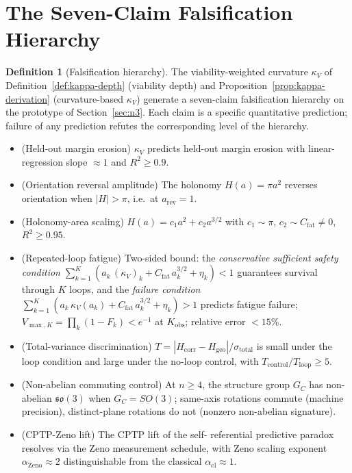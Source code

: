 \documentclass[11pt,a4paper]{article}
\theoremstyle{plain}
\theoremstyle{definition}
\newtheorem{definition}[theorem]{Definition}
\theoremstyle{remark}
\newcommand{\kk}{\kappa_{\!V}}
\newcommand{\so}{\mathfrak{so}}
\begin{document}
\section{The Seven-Claim Falsification Hierarchy}\label{sec:hierarchy}

\begin{definition}[Falsification hierarchy]
\label{def:hierarchy}
The viability-weighted curvature $\kk$ of
Definition~\ref{def:kappa-depth} (viability depth) and
Proposition~\ref{prop:kappa-derivation} (curvature-based $\kk$) generate
a seven-claim falsification
hierarchy on the prototype of Section~\ref{sec:n3}. Each claim is a
specific quantitative prediction; failure of any prediction refutes
the corresponding level of the hierarchy.
\begin{itemize}[leftmargin=1.2em,itemsep=2pt]
\item[\textbf{A.}] (Held-out margin erosion) $\kk$ predicts held-out
margin erosion with linear-regression slope $\approx 1$ and $R^2\geq 0.9$.
\item[\textbf{B.}] (Orientation reversal amplitude) The holonomy
$H(a)=\pi a^2$ reverses orientation when $|H|>\pi$, i.e.\ at
$a_{\mathrm{rev}}=1$.
\item[\textbf{C.}] (Holonomy-area scaling) $H(a) = c_1 a^2 + c_2
a^{3/2}$ with $c_1\sim\pi$, $c_2\sim C_{\mathrm{fat}}\neq 0$, $R^2\geq
0.95$.
\item[\textbf{D.}] (Repeated-loop fatigue) Two-sided bound: the
\emph{conservative sufficient safety condition} $\sum_{k=1}^{K}(a_k\,
(\kk)_k + C_{\mathrm{fat}}\,a_k^{3/2} + \eta_k) < 1$ guarantees survival
through $K$ loops, and the \emph{failure condition}
$\sum_{k=1}^{K}(a_k\,\kk(a_k) + C_{\mathrm{fat}}\,a_k^{3/2} + \eta_k) > 1$
predicts fatigue failure; $V_{\max,K}=\prod_k(1-F_k)<e^{-1}$ at
$K_{\mathrm{obs}}$; relative error $<15\%$.
\item[\textbf{E.}] (Total-variance discrimination) $T =
|H_{\mathrm{corr}}-H_{\mathrm{geo}}|/\sigma_{\mathrm{total}}$ is small
under the loop condition and large under the no-loop control, with
$T_{\mathrm{control}}/T_{\mathrm{loop}}\geq 5$.
\item[\textbf{F.}] (Non-abelian commuting control) At $n\geq 4$, the
structure group $G_C$ has non-abelian $\so(3)$ when $G_C = SO(3)$; same-axis
rotations commute (machine precision), distinct-plane rotations do not
(nonzero non-abelian signature).
\item[\textbf{G.}] (CPTP-Zeno lift) The CPTP lift of the self-
referential predictive paradox resolves via the Zeno measurement
schedule, with Zeno scaling exponent $\alpha_{\mathrm{Zeno}}\approx 2$
distinguishable from the classical $\alpha_{\mathrm{cl}}\approx 1$.
\end{itemize}
\end{definition}
\end{document}
